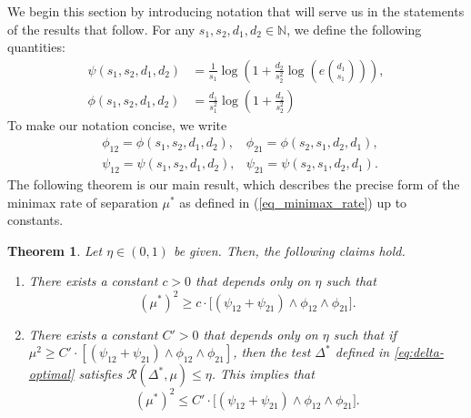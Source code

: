 \documentclass{article}
\newcommand{\cR}{\mathcal{R}}
\newtheorem{theorem}{Theorem}
\theoremstyle{remark}
\begin{document}
 We begin this section by introducing notation that will serve us in the statements of the results that follow. For any $s_1,s_2, d_1, d_2 \in \mathbb N$, we define the following quantities:
\begin{align}
    \psi(s_1,s_2,d_1,d_2) &= \frac{1}{s_1} \log\left(1+ \frac{d_2}{s_2^2} \log\left(e{d_1 \choose s_1}\right)\right), \label{eq_def_psi}\\[5pt]
    \phi(s_1,s_2, d_1,d_2) &= 
        \frac{d_1}{s_1^2} \log\left(1+\frac{d_2}{s_2^2}\right)\label{eq_def_phi}
\end{align}
To make our notation concise, we write
\begin{align*}
    &\phi_{12} = \phi(s_1,s_2, d_1,d_2),
    &\phi_{21} = \phi(s_2,s_1, d_2,d_1),\,\\
    &\psi_{12} = \psi(s_1,s_2, d_1,d_2),
    &\psi_{21} = \psi(s_2,s_1, d_2,d_1).
\end{align*}
The following theorem is our main result, which describes the precise form of the minimax rate of separation $\mu^*$ as defined in (\ref{eq_minimax_rate}) up to constants.
\begin{theorem}\label{thm_main}
    Let $\eta \in (0,1)$ be given. Then, the following claims hold. %
    \begin{enumerate}
        \item There exists a constant $c > 0$ that depends only on $\eta$ such that
        \begin{equation}
            (\mu^*)^2 \geq c \cdot \big[\left( \psi_{12} + \psi_{21}\right) \land \phi_{12} \land \phi_{21} \big].
        \end{equation}
        \item There exists a constant $C' > 0$ that depends only on $\eta$ such that if $\mu^2 \geq C' \cdot [(\psi_{12} + \psi_{21}) \land \phi_{12} \land \phi_{21}]$, then the test $\Delta^*$ defined in \eqref{eq:delta-optimal} satisfies
        $\cR(\Delta^*, \mu) \leq \eta$.
        This implies that 
        \begin{equation}
            (\mu^*)^2 \leq C' \cdot \big[\left( \psi_{12} + \psi_{21}\right) \land \phi_{12} \land \phi_{21} \big].
        \end{equation}
    \end{enumerate}
\end{theorem}
\end{document}
